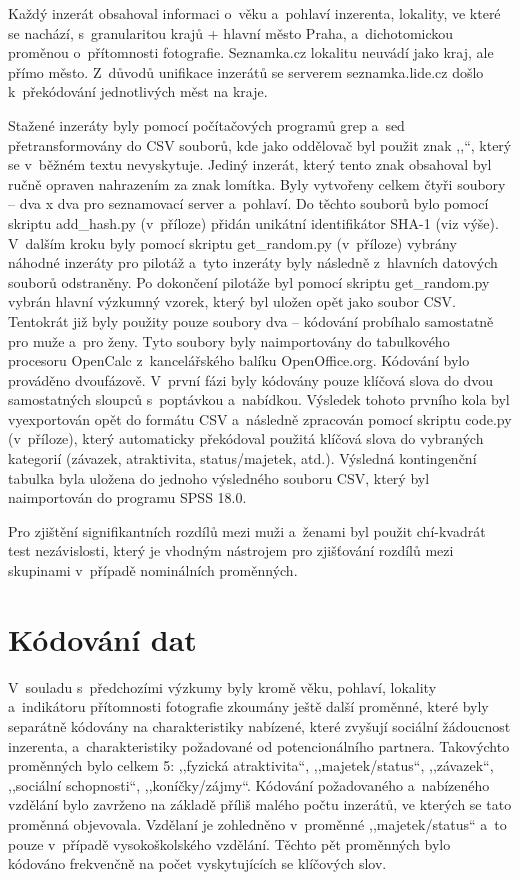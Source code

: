 \documentclass[a4paper, 12pt, notitlepage, oneside, numbers=noenddot]{report}
\begin{document}
Každý inzerát obsahoval informaci o~věku a~pohlaví inzerenta,
lokality, ve které se nachází, s~granularitou krajů + hlavní město
Praha, a~dichotomickou proměnou o~přítomnosti fotografie. Seznamka.cz
lokalitu neuvádí jako kraj, ale přímo město. Z~důvodů unifikace
inzerátů se serverem seznamka.lide.cz došlo k~překódování jednotlivých
měst na kraje.

Stažené inzeráty byly pomocí počítačových programů grep a~sed
přetransformovány do CSV souborů, kde jako oddělovač byl použit znak
,,{\textbar}``, který se v~běžném textu nevyskytuje. Jediný inzerát,
který tento znak obsahoval byl ručně opraven nahrazením za znak
lomítka. Byly vytvořeny celkem čtyři soubory -- dva x dva pro
seznamovací server a~pohlaví. Do těchto souborů bylo pomocí skriptu
add\_hash.py (v~příloze) přidán unikátní identifikátor SHA-1 (viz
výše). V~dalším kroku byly pomocí skriptu get\_random.py (v~pří\-loze)
vybrány náhodné inzeráty pro pilotáž a~tyto inzeráty byly následně
z~hlavních datových souborů odstraněny. Po dokončení pilotáže byl
pomocí skriptu get\_random.py vybrán hlavní výzkumný vzorek, který byl
uložen opět jako soubor CSV.  Tentokrát již byly použity pouze soubory
dva -- kódování probíhalo samostatně pro muže a~pro ženy.  Tyto
soubory byly naimportovány do tabulkového procesoru OpenCalc
z~kancelářského balíku OpenOffice.org. Kódování bylo prováděno
dvoufázově. V~první fázi byly kódovány pouze klíčová slova do dvou
samostatných sloupců s~poptávkou a~nabídkou. Výsledek tohoto prvního
kola byl vyexportován opět do formátu CSV a~následně zpracován pomocí
skriptu code.py (v~příloze), který automaticky překódoval použitá
klíčová slova do vybraných kategorií (závazek, atraktivita,
status/majetek, atd.).  Výsledná kontingenční tabulka byla uložena do
jednoho výsledného souboru CSV, který byl naimportován do programu
SPSS 18.0.

Pro zjištění signifikantních rozdílů mezi muži a~ženami byl použit
chí-kvadrát test nezávislosti, který je vhodným nástrojem pro
zjišťování rozdílů mezi skupinami v~případě nominálních proměnných.

\section{Kódování dat}
V~souladu s~předchozími výzkumy
\citep{HarrisonSaeed1977,GreenlessMcGrew1994,BarrettDunbarLycett2007}
byly kromě věku, pohlaví, lokality a~indikátoru přítomnosti fotografie
zkoumány ještě další proměnné, které byly separátně kódovány na
charakteristiky nabízené, které zvyšují sociální žádoucnost inzerenta,
a~charakteristiky požadované od potencionálního partnera. Takovýchto
proměnných bylo celkem 5: ,,fyzická atraktivita``, ,,majetek/status``,
,,závazek``, ,,sociální schopnosti``, ,,koníčky/zájmy``. Kódování
požadovaného a~nabízeného vzdělání bylo zavrženo na základě příliš
malého počtu inzerátů, ve kterých se tato proměnná
objevovala. Vzdělaní je zohledněno v~proměnné ,,majetek/sta\-tus`` a~to
pouze v~případě vysokoškolského vzdělání. Těchto pět proměnných bylo
kódováno frekvenčně na počet vyskytujících se klíčových slov.
\end{document}
